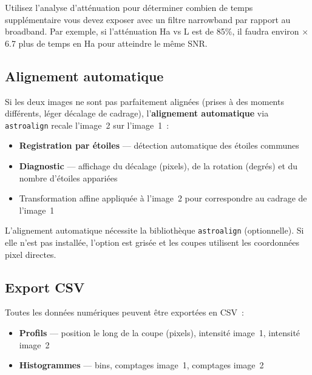 \documentclass[a4paper,11pt]{article}
\begin{document}
\begin{tipbox}
Utilisez l'analyse d'att\'{e}nuation pour d\'{e}terminer combien de temps suppl\'{e}mentaire vous devez exposer avec un filtre narrowband par rapport au broadband. Par exemple, si l'att\'{e}nuation Ha vs L est de 85\%, il faudra environ $\times$6.7 plus de temps en Ha pour atteindre le m\^{e}me SNR.
\end{tipbox}

\subsection{Alignement automatique}

Si les deux images ne sont pas parfaitement align\'{e}es (prises \`{a} des moments diff\'{e}rents, l\'{e}ger d\'{e}calage de cadrage), l'\textbf{alignement automatique} via \texttt{astroalign} recale l'image~2 sur l'image~1~:

\begin{itemize}
    \item \textbf{Registration par \'{e}toiles} --- d\'{e}tection automatique des \'{e}toiles communes
    \item \textbf{Diagnostic} --- affichage du d\'{e}calage (pixels), de la rotation (degr\'{e}s) et du nombre d'\'{e}toiles appari\'{e}es
    \item Transformation affine appliqu\'{e}e \`{a} l'image~2 pour correspondre au cadrage de l'image~1
\end{itemize}

\begin{notebox}
L'alignement automatique n\'{e}cessite la biblioth\`{e}que \texttt{astroalign} (optionnelle). Si elle n'est pas install\'{e}e, l'option est gris\'{e}e et les coupes utilisent les coordonn\'{e}es pixel directes.
\end{notebox}

\subsection{Export CSV}

Toutes les donn\'{e}es num\'{e}riques peuvent \^{e}tre export\'{e}es en CSV~:

\begin{itemize}
    \item \textbf{Profils} --- position le long de la coupe (pixels), intensit\'{e} image~1, intensit\'{e} image~2
    \item \textbf{Histogrammes} --- bins, comptages image~1, comptages image~2
\end{itemize}
\end{document}
